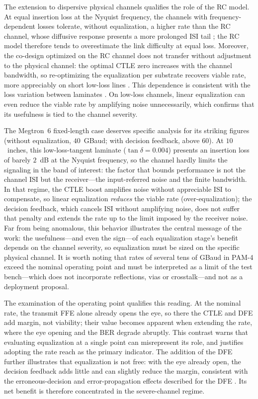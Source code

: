 \documentclass{ieeeaccess}
\begin{document}
The extension to dispersive physical channels qualifies the role of the RC
model. At equal insertion loss at the Nyquist frequency, the channels with
frequency-dependent losses tolerate, without equalization, a higher rate
than the RC channel, whose diffusive response presents a more prolonged ISI
tail \cite{8861405}; the RC model therefore tends to overestimate the link
difficulty at equal loss. Moreover, the co-design optimized on the RC
channel does not transfer without adjustment to the physical channel: the
optimal CTLE zero increases with the channel bandwidth, so re-optimizing the
equalization per substrate recovers viable rate, more appreciably on short
low-loss lines \cite{11169790}. This dependence is consistent with the loss
variation between laminates \cite{9785524,10385078,915226}. On low-loss
channels, linear equalization can even reduce the viable rate by amplifying
noise unnecessarily, which confirms that its usefulness is tied to the
channel severity.

The Megtron~6 fixed-length case deserves specific analysis for its striking
figures (without equalization, $40$~GBaud; with decision feedback, above
$60$). At $10$~inches, this low-loss-tangent laminate ($\tan\delta=0.004$)
presents an insertion loss of barely $2$~dB at the Nyquist frequency, so the
channel hardly limits the signaling in the band of interest: the factor that
bounds performance is not the channel ISI but the receiver---the
input-referred noise and the finite bandwidth. In that regime, the CTLE
boost amplifies noise without appreciable ISI to compensate, so linear
equalization \emph{reduces} the viable rate (over-equalization); the decision
feedback, which cancels ISI without amplifying noise, does not suffer that
penalty and extends the rate up to the limit imposed by the receiver noise.
Far from being anomalous, this behavior illustrates the central message of
the work: the usefulness---and even the sign---of each equalization stage's
benefit depends on the channel severity, so equalization must be sized on the
specific physical channel. It is worth noting that rates of several tens of
GBaud in PAM-4 exceed the nominal operating point and must be interpreted as
a limit of the test bench---which does not incorporate reflections, vias or
crosstalk---and not as a deployment proposal.

The examination of the operating point qualifies this reading. At the
nominal rate, the transmit FFE alone already opens the eye, so there the CTLE
and DFE add margin, not viability; their value becomes apparent when
extending the rate, where the eye opening and the BER degrade abruptly. This
contrast warns that evaluating equalization at a single point can
misrepresent its role, and justifies adopting the rate reach as the primary
indicator. The addition of the DFE further illustrates that equalization is
not free: with the eye already open, the decision feedback adds little and
can slightly reduce the margin, consistent with the erroneous-decision and
error-propagation effects described for the DFE \cite{10584882,9505189}. Its
net benefit is therefore concentrated in the severe-channel regime.
\end{document}
